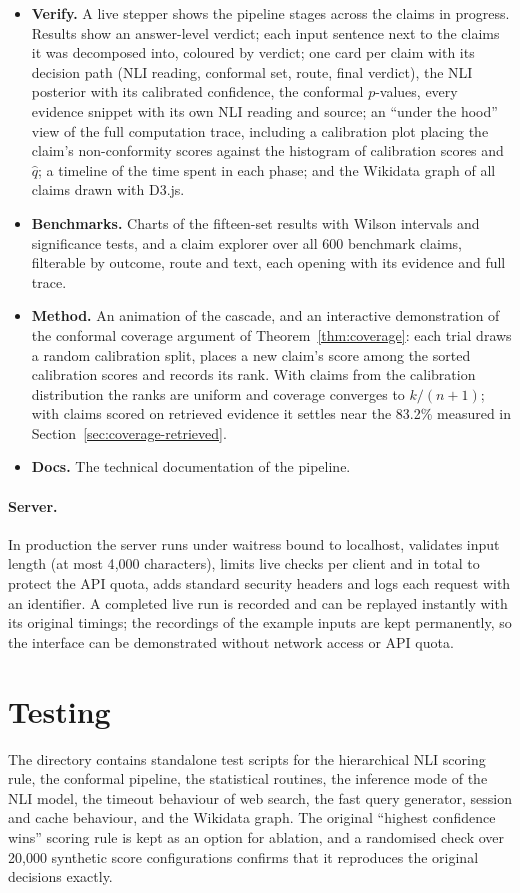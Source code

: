 \begin{itemize}[itemsep=0.3em]
  \item \textbf{Verify.} A live stepper shows the pipeline stages across the claims in progress. Results show an answer-level verdict; each input sentence next to the claims it was decomposed into, coloured by verdict; one card per claim with its decision path (NLI reading, conformal set, route, final verdict), the NLI posterior with its calibrated confidence, the conformal $p$-values, every evidence snippet with its own NLI reading and source; an ``under the hood'' view of the full computation trace, including a calibration plot placing the claim's non-conformity scores against the histogram of calibration scores and $\hat{q}$; a timeline of the time spent in each phase; and the Wikidata graph of all claims drawn with D3.js.
  \item \textbf{Benchmarks.} Charts of the fifteen-set results with Wilson intervals and significance tests, and a claim explorer over all 600 benchmark claims, filterable by outcome, route and text, each opening with its evidence and full trace.
  \item \textbf{Method.} An animation of the cascade, and an interactive demonstration of the conformal coverage argument of Theorem~\ref{thm:coverage}: each trial draws a random calibration split, places a new claim's score among the sorted calibration scores and records its rank. With claims from the calibration distribution the ranks are uniform and coverage converges to $k/(n+1)$; with claims scored on retrieved evidence it settles near the 83.2\% measured in Section~\ref{sec:coverage-retrieved}.
  \item \textbf{Docs.} The technical documentation of the pipeline.
\end{itemize}

\paragraph{Server.} In production the server runs under waitress bound to localhost, validates input length (at most 4{,}000 characters), limits live checks per client and in total to protect the API quota, adds standard security headers and logs each request with an identifier. A completed live run is recorded and can be replayed instantly with its original timings; the recordings of the example inputs are kept permanently, so the interface can be demonstrated without network access or API quota.

\section{Testing}

The  directory contains standalone test scripts for the hierarchical NLI scoring rule, the conformal pipeline, the statistical routines, the inference mode of the NLI model, the timeout behaviour of web search, the fast query generator, session and cache behaviour, and the Wikidata graph. The original ``highest confidence wins'' scoring rule is kept as an option for ablation, and a randomised check over 20{,}000 synthetic score configurations confirms that it reproduces the original decisions exactly.

